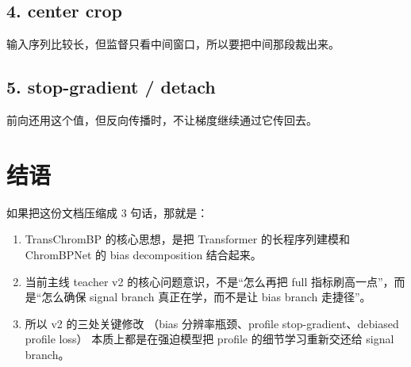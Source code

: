\documentclass[11pt,a4paper]{ctexart}
\begin{document}
\subsection*{4. center crop}

输入序列比较长，但监督只看中间窗口，所以要把中间那段裁出来。

\subsection*{5. stop-gradient / detach}

前向还用这个值，但反向传播时，不让梯度继续通过它传回去。

\section{结语}

如果把这份文档压缩成 3 句话，那就是：

\begin{enumerate}[leftmargin=2em]
\item TransChromBP 的核心思想，是把 Transformer 的长程序列建模和 ChromBPNet 的 bias decomposition 结合起来。
\item 当前主线 teacher v2 的核心问题意识，不是“怎么再把 full 指标刷高一点”，而是“怎么确保 signal branch 真正在学，而不是让 bias branch 走捷径”。
\item 所以 v2 的三处关键修改
  （bias 分辨率瓶颈、profile stop-gradient、debiased profile loss）
  本质上都是在强迫模型把 profile 的细节学习重新交还给 signal branch。
\end{enumerate}
\end{document}
